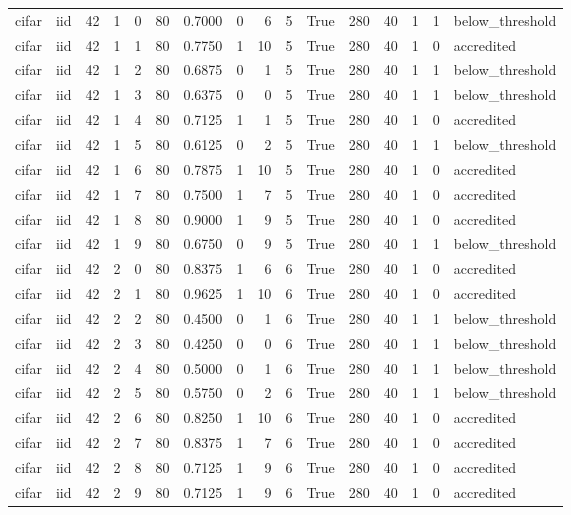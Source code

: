 \begin{tabular}{llrrrrrrrrrrrrrl}
cifar & iid & 42 & 1 & 0 & 80 & 0.7000 & 0 & 6 & 5 & True & 280 & 40 & 1 & 1 & below\_threshold \\
cifar & iid & 42 & 1 & 1 & 80 & 0.7750 & 1 & 10 & 5 & True & 280 & 40 & 1 & 0 & accredited \\
cifar & iid & 42 & 1 & 2 & 80 & 0.6875 & 0 & 1 & 5 & True & 280 & 40 & 1 & 1 & below\_threshold \\
cifar & iid & 42 & 1 & 3 & 80 & 0.6375 & 0 & 0 & 5 & True & 280 & 40 & 1 & 1 & below\_threshold \\
cifar & iid & 42 & 1 & 4 & 80 & 0.7125 & 1 & 1 & 5 & True & 280 & 40 & 1 & 0 & accredited \\
cifar & iid & 42 & 1 & 5 & 80 & 0.6125 & 0 & 2 & 5 & True & 280 & 40 & 1 & 1 & below\_threshold \\
cifar & iid & 42 & 1 & 6 & 80 & 0.7875 & 1 & 10 & 5 & True & 280 & 40 & 1 & 0 & accredited \\
cifar & iid & 42 & 1 & 7 & 80 & 0.7500 & 1 & 7 & 5 & True & 280 & 40 & 1 & 0 & accredited \\
cifar & iid & 42 & 1 & 8 & 80 & 0.9000 & 1 & 9 & 5 & True & 280 & 40 & 1 & 0 & accredited \\
cifar & iid & 42 & 1 & 9 & 80 & 0.6750 & 0 & 9 & 5 & True & 280 & 40 & 1 & 1 & below\_threshold \\
cifar & iid & 42 & 2 & 0 & 80 & 0.8375 & 1 & 6 & 6 & True & 280 & 40 & 1 & 0 & accredited \\
cifar & iid & 42 & 2 & 1 & 80 & 0.9625 & 1 & 10 & 6 & True & 280 & 40 & 1 & 0 & accredited \\
cifar & iid & 42 & 2 & 2 & 80 & 0.4500 & 0 & 1 & 6 & True & 280 & 40 & 1 & 1 & below\_threshold \\
cifar & iid & 42 & 2 & 3 & 80 & 0.4250 & 0 & 0 & 6 & True & 280 & 40 & 1 & 1 & below\_threshold \\
cifar & iid & 42 & 2 & 4 & 80 & 0.5000 & 0 & 1 & 6 & True & 280 & 40 & 1 & 1 & below\_threshold \\
cifar & iid & 42 & 2 & 5 & 80 & 0.5750 & 0 & 2 & 6 & True & 280 & 40 & 1 & 1 & below\_threshold \\
cifar & iid & 42 & 2 & 6 & 80 & 0.8250 & 1 & 10 & 6 & True & 280 & 40 & 1 & 0 & accredited \\
cifar & iid & 42 & 2 & 7 & 80 & 0.8375 & 1 & 7 & 6 & True & 280 & 40 & 1 & 0 & accredited \\
cifar & iid & 42 & 2 & 8 & 80 & 0.7125 & 1 & 9 & 6 & True & 280 & 40 & 1 & 0 & accredited \\
cifar & iid & 42 & 2 & 9 & 80 & 0.7125 & 1 & 9 & 6 & True & 280 & 40 & 1 & 0 & accredited \\

\end{tabular}
